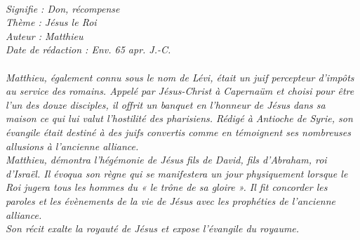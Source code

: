 \BFont
\noindent\hrulefill
\textit{
\bigskip
{\centering{}
\\Signifie : Don, récompense
\\Thème : Jésus le Roi
\\Auteur : Matthieu
\\Date de rédaction : Env. 65 apr. J.-C.\\}
}
\textit{
\\Matthieu, également connu sous le nom de Lévi, était un juif percepteur d’impôts au service des romains. Appelé par Jésus-Christ à Capernaüm et choisi pour être l’un des douze disciples, il offrit un banquet en l’honneur de Jésus dans sa maison ce qui lui valut l’hostilité des pharisiens.  Rédigé à Antioche de Syrie, son évangile était destiné à des juifs convertis comme en témoignent ses nombreuses allusions à l’ancienne alliance.
\bigskip
\\Matthieu, démontra l’hégémonie de Jésus fils de David, fils d’Abraham, roi d’Israël. Il évoqua  son règne qui se manifestera un jour physiquement lorsque le Roi jugera tous les hommes du « le trône de sa gloire ». Il fit concorder  les paroles et les évènements de la vie de Jésus avec les prophéties de l’ancienne alliance.
\bigskip
\\Son récit exalte la royauté de Jésus et expose l’évangile du royaume.\bigskip
}
\par\nobreak\noindent\hrulefill
